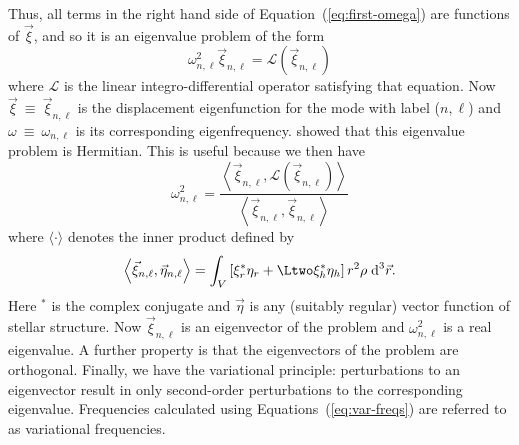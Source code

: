 %
Thus, all terms in the right hand side of Equation~(\ref{eq:first-omega}) are functions of $\vec\xi$, and so it is an eigenvalue problem of the form
\begin{equation} \label{eq:operator}
    \omega^2_{n,\ell}
    \vec\xi_{n,\ell}
    =
    \mathcal{L}(\vec\xi_{n,\ell})
\end{equation}
where $\mathcal{L}$ is the linear integro-differential operator satisfying that equation. 
Now ${\vec\xi~\equiv~\vec\xi_{n,\ell}}$ is the displacement eigenfunction for the mode with label (${n,\ell}$) and ${\omega~\equiv~\omega_{n,\ell}}$ is its corresponding eigenfrequency. 
\citet{1964ApJ...139..664C} 
showed that this eigenvalue problem is Hermitian. 
This is useful because we then have 
\begin{equation} \label{eq:var-freqs}
    \omega^2_{n,\ell}
    =
    \frac{
        \left\langle
            \vec\xi_{n,\ell}, 
            \mathcal{L}(\vec \xi_{n,\ell})
        \right\rangle
    }{
        \left\langle
            \vec\xi_{n,\ell},
            \vec\xi_{n,\ell}
        \right\rangle
    }
\end{equation}
where ${\langle\cdot\rangle}$ denotes the inner product defined by
\begin{equation} \label{eq:inner-prod}
    \left\langle
        \vec\xi_{n,\ell}, \vec\eta_{n,\ell}
    \right\rangle
    =
    \int_V \left[
        \xi_r^\ast \eta_r
        +
        \Ltwo
        \xi_h^\ast \eta_h
    \right]
    r^2\rho
    \;\text{d}^3 \vec r.
\end{equation}
Here $^\ast$ is the complex conjugate and $\vec\eta$ is any (suitably regular) vector function of stellar structure. 
Now $\vec\xi_{n,\ell}$ is an eigenvector of the problem and $\omega^2_{n,\ell}$ is a real eigenvalue. 
A further property is that the eigenvectors of the problem are orthogonal. 
Finally, we have the variational principle: perturbations to an eigenvector result in only second-order perturbations to the corresponding eigenvalue. %
Frequencies calculated using Equations~(\ref{eq:var-freqs}) are referred to as variational frequencies. 


